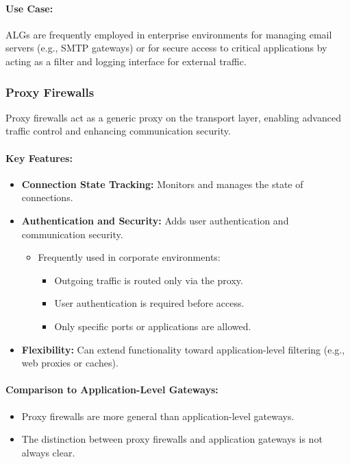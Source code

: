 \paragraph{Use Case:}
ALGs are frequently employed in enterprise environments for managing email servers (e.g., SMTP gateways) or for secure access to critical applications by acting as a filter and logging interface for external traffic.

\subsubsection{Proxy Firewalls}
Proxy firewalls act as a generic proxy on the transport layer, enabling advanced traffic control and enhancing communication security.
\paragraph{Key Features:}
\begin{itemize}
    \item \textbf{Connection State Tracking:} Monitors and manages the state of connections.
    \item \textbf{Authentication and Security:} Adds user authentication and communication security.
    \begin{itemize}
        \item Frequently used in corporate environments:
        \begin{itemize}
            \item Outgoing traffic is routed only via the proxy.
            \item User authentication is required before access.
            \item Only specific ports or applications are allowed.
        \end{itemize}
    \end{itemize}
    \item \textbf{Flexibility:} Can extend functionality toward application-level filtering (e.g., web proxies or caches).
\end{itemize}
\paragraph{Comparison to Application-Level Gateways:}
\begin{itemize}
    \item Proxy firewalls are more general than application-level gateways.
    \item The distinction between proxy firewalls and application gateways is not always clear.
\end{itemize}

